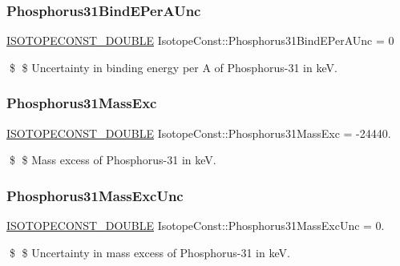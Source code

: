 \subsubsection{\texorpdfstring{Phosphorus31\+Bind\+E\+Per\+A\+Unc}{Phosphorus31BindEPerAUnc}}
{\footnotesize\ttfamily \mbox{\hyperlink{group___isotope_const-_macros_ga8f45a7272ce02c0b4c65c44636ed719a}{I\+S\+O\+T\+O\+P\+E\+C\+O\+N\+S\+T\+\_\+\+D\+O\+U\+B\+LE}} Isotope\+Const\+::\+Phosphorus31\+Bind\+E\+Per\+A\+Unc = 0}

\$ \$ Uncertainty in binding energy per A of Phosphorus-\/31 in keV. \mbox{\label{group___isotope_const-_phosphorus-_p31_gaa22b330965182eb12663f3a8bd24e355}} 
\subsubsection{\texorpdfstring{Phosphorus31\+Mass\+Exc}{Phosphorus31MassExc}}
{\footnotesize\ttfamily \mbox{\hyperlink{group___isotope_const-_macros_ga8f45a7272ce02c0b4c65c44636ed719a}{I\+S\+O\+T\+O\+P\+E\+C\+O\+N\+S\+T\+\_\+\+D\+O\+U\+B\+LE}} Isotope\+Const\+::\+Phosphorus31\+Mass\+Exc = -\/24440.}

\$ \$ Mass excess of Phosphorus-\/31 in keV. \mbox{\label{group___isotope_const-_phosphorus-_p31_ga8db879bf9008994a56147042215b8011}} 
\subsubsection{\texorpdfstring{Phosphorus31\+Mass\+Exc\+Unc}{Phosphorus31MassExcUnc}}
{\footnotesize\ttfamily \mbox{\hyperlink{group___isotope_const-_macros_ga8f45a7272ce02c0b4c65c44636ed719a}{I\+S\+O\+T\+O\+P\+E\+C\+O\+N\+S\+T\+\_\+\+D\+O\+U\+B\+LE}} Isotope\+Const\+::\+Phosphorus31\+Mass\+Exc\+Unc = 0.}

\$ \$ Uncertainty in mass excess of Phosphorus-\/31 in keV. \mbox{\label{group___isotope_const-_phosphorus-_p31_ga8e11e84dc81184cb5724c1b01e0c64f1}} 
